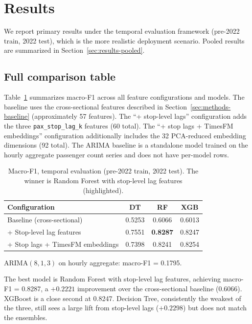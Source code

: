 \section{Results}
\label{sec:results}

We report primary results under the temporal evaluation framework (pre-2022
train, 2022 test), which is the more realistic deployment scenario. Pooled
results are summarized in Section~\ref{sec:results-pooled}.

\subsection{Full comparison table}

Table~\ref{tab:main-results} summarizes macro-F1 across all feature
configurations and models. The baseline uses the cross-sectional features
described in Section~\ref{sec:methods-baseline} (approximately 57 features).
The ``+ stop-level lags'' configuration adds the three
\texttt{pax\_stop\_lag\_k} features (60 total). The ``+ stop lags + TimesFM
embeddings'' configuration additionally includes the 32 PCA-reduced
embedding dimensions (92 total). The ARIMA baseline is a standalone model
trained on the hourly aggregate passenger count series and does not have
per-model rows.

\begin{table}[t]
  \centering
  \caption{Macro-F1, temporal evaluation (pre-2022 train, 2022 test).
    The winner is Random Forest with stop-level lag features
    (highlighted).}
  \label{tab:main-results}
  \begin{tabular}{l c c c}
    \toprule
    Configuration & DT & RF & XGB \\
    \midrule
    Baseline (cross-sectional)        & 0.5253 & 0.6066 & 0.6013 \\
    + Stop-level lag features         & 0.7551 & \textbf{0.8287} & 0.8247 \\
    + Stop lags + TimesFM embeddings  & 0.7398 & 0.8241 & 0.8254 \\
    \bottomrule
  \end{tabular}
  \vspace{2pt}

  \small
  $\text{ARIMA}(8, 1, 3)$ on hourly aggregate: macro-F1 = 0.1795.
\end{table}

The best model is Random Forest with stop-level lag features, achieving
macro-F1 = 0.8287, a $+0.2221$ improvement over the cross-sectional baseline
(0.6066). XGBoost is a close second at 0.8247. Decision Tree, consistently
the weakest of the three, still sees a large lift from stop-level lags
($+0.2298$) but does not match the ensembles.

